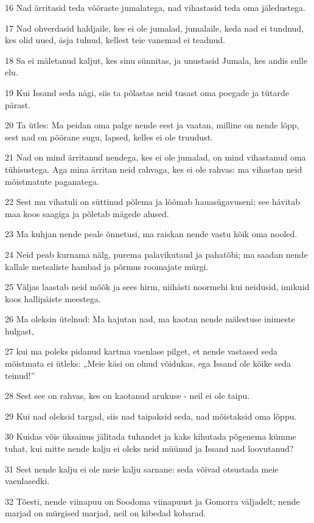 \par 16 Nad ärritasid teda võõraste jumalatega, nad vihastasid teda oma jäledustega.
\par 17 Nad ohverdasid haldjaile, kes ei ole jumalad, jumalaile, keda nad ei tundnud, kes olid uued, äsja tulnud, kellest teie vanemad ei teadnud.
\par 18 Sa ei mäletanud kaljut, kes sinu sünnitas, ja unustasid Jumala, kes andis sulle elu.
\par 19 Kui Issand seda nägi, siis ta põlastas neid tusast oma poegade ja tütarde pärast.
\par 20 Ta ütles: Ma peidan oma palge nende eest ja vaatan, milline on nende lõpp, sest nad on pöörane sugu, lapsed, kelles ei ole truudust.
\par 21 Nad on mind ärritanud nendega, kes ei ole jumalad, on mind vihastanud oma tühisustega. Aga mina ärritan neid rahvaga, kes ei ole rahvas: ma vihastan neid mõistmatute paganatega.
\par 22 Sest mu vihatuli on süttinud põlema ja lõõmab hauasügavuseni; see hävitab maa koos saagiga ja põletab mägede alused.
\par 23 Ma kuhjan nende peale õnnetusi, ma raiskan nende vastu kõik oma nooled.
\par 24 Neid peab kurnama nälg, purema palavikutaud ja pahatõbi; ma saadan nende kallale metsaliste hambad ja põrmus roomajate mürgi.
\par 25 Väljas laastab neid mõõk ja sees hirm, niihästi noormehi kui neidusid, imikuid koos hallipäiste meestega.
\par 26 Ma oleksin ütelnud: Ma hajutan nad, ma kaotan nende mälestuse inimeste hulgast,
\par 27 kui ma poleks pidanud kartma vaenlase pilget, et nende vastased seda mõistmata ei ütleks: „Meie käsi on olnud võidukas, ega Issand ole kõike seda teinud!”
\par 28 Sest see on rahvas, kes on kaotanud arukuse - neil ei ole taipu.
\par 29 Kui nad oleksid targad, siis nad taipaksid seda, nad mõistaksid oma lõppu.
\par 30 Kuidas võis üksainus jälitada tuhandet ja kaks kihutada põgenema kümme tuhat, kui mitte nende kalju ei oleks neid müünud ja Issand nad loovutanud?
\par 31 Sest nende kalju ei ole meie kalju sarnane: seda võivad otsustada meie vaenlasedki.
\par 32 Tõesti, nende viinapuu on Soodoma viinapuust ja Gomorra väljadelt; nende marjad on mürgised marjad, neil on kibedad kobarad.
